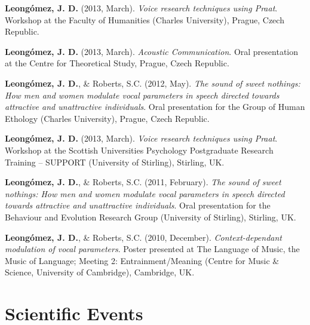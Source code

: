 \documentclass[11pt,a4paper,]{awesome-cv}
\begin{document}
\textbf{Leongómez, J. D.} (2013, March). \emph{Voice research techniques
using Praat}. Workshop at the Faculty of Humanities (Charles
University), Prague, Czech Republic.

\textbf{Leongómez, J. D.} (2013, March). \emph{Acoustic Communication}.
Oral presentation at the Centre for Theoretical Study, Prague, Czech
Republic.

\textbf{Leongómez, J. D.}, \& Roberts, S.C. (2012, May). \emph{The sound
of sweet nothings: How men and women modulate vocal parameters in speech
directed towards attractive and unattractive individuals}. Oral
presentation for the Group of Human Ethology (Charles University),
Prague, Czech Republic.

\textbf{Leongómez, J. D.} (2013, March). \emph{Voice research techniques
using Praat}. Workshop at the Scottish Universities Psychology
Postgraduate Research Training -- SUPPORT (University of Stirling),
Stirling, UK.

\textbf{Leongómez, J. D.}, \& Roberts, S.C. (2011, February). \emph{The
sound of sweet nothings: How men and women modulate vocal parameters in
speech directed towards attractive and unattractive individuals}. Oral
presentation for the Behaviour and Evolution Research Group (University
of Stirling), Stirling, UK.

\textbf{Leongómez, J. D.}, \& Roberts, S.C. (2010, December).
\emph{Context-dependant modulation of vocal parameters}. Poster
presented at The Language of Music, the Music of Language; Meeting 2:
Entrainment/Meaning (Centre for Music \& Science, University of
Cambridge), Cambridge, UK.

\endgroup

\section{Scientific Events}\label{scientific-events}
\end{document}
